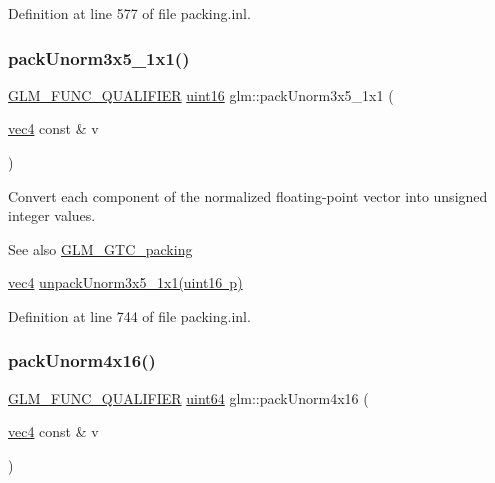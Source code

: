 Definition at line 577 of file packing.\+inl.

\mbox{\label{group__gtc__packing_ga1b41375846ed66768da78ca299d8d010}} 
\subsubsection{\texorpdfstring{packUnorm3x5\_1x1()}{packUnorm3x5\_1x1()}}
{\footnotesize\ttfamily \mbox{\hyperlink{setup_8hpp_a33fdea6f91c5f834105f7415e2a64407}{G\+L\+M\+\_\+\+F\+U\+N\+C\+\_\+\+Q\+U\+A\+L\+I\+F\+I\+ER}} \mbox{\hyperlink{group__gtc__type__precision_gad8c2939e1fdd8e5828b31d95c52255d5}{uint16}} glm\+::pack\+Unorm3x5\+\_\+1x1 (\begin{DoxyParamCaption}\item[{\mbox{\hyperlink{group__core__types_ga5881b1b022d7fd1b7218f5916532dd02}{vec4}} const \&}]{v }\end{DoxyParamCaption})}

Convert each component of the normalized floating-\/point vector into unsigned integer values.

\begin{DoxySeeAlso}{See also}
\mbox{\hyperlink{group__gtc__packing}{G\+L\+M\+\_\+\+G\+T\+C\+\_\+packing}} 

\mbox{\hyperlink{group__core__types_ga5881b1b022d7fd1b7218f5916532dd02}{vec4}} \mbox{\hyperlink{group__gtc__packing_gaab3b476e8f320670717fd518f350ce28}{unpack\+Unorm3x5\+\_\+1x1(uint16 p)}} 
\end{DoxySeeAlso}


Definition at line 744 of file packing.\+inl.

\mbox{\label{group__gtc__packing_gac561f06c908b7302537a8ef29fcb409e}} 
\subsubsection{\texorpdfstring{packUnorm4x16()}{packUnorm4x16()}}
{\footnotesize\ttfamily \mbox{\hyperlink{setup_8hpp_a33fdea6f91c5f834105f7415e2a64407}{G\+L\+M\+\_\+\+F\+U\+N\+C\+\_\+\+Q\+U\+A\+L\+I\+F\+I\+ER}} \mbox{\hyperlink{group__gtc__type__precision_gae3632bf9b37da66233d78930dd06378a}{uint64}} glm\+::pack\+Unorm4x16 (\begin{DoxyParamCaption}\item[{\mbox{\hyperlink{group__core__types_ga5881b1b022d7fd1b7218f5916532dd02}{vec4}} const \&}]{v }\end{DoxyParamCaption})}

